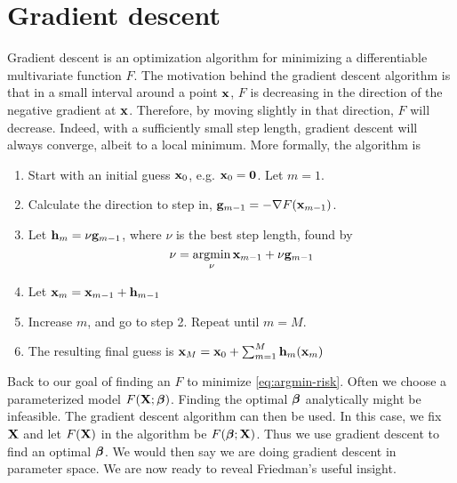 \section{Gradient descent}
Gradient descent is an optimization algorithm for minimizing a differentiable multivariate function $F$. The motivation behind the gradient descent algorithm is that in a small interval around a point $\mathbf{x}$, $F$ is decreasing in the direction of the negative gradient at $\mathbf{x}$. Therefore, by moving slightly in that direction, $F$ will decrease. Indeed, with a sufficiently small step length, gradient descent will always converge, albeit to a local minimum. More formally, the algorithm is
\begin{enumerate}
    \item Start with an initial guess $\mathbf{x}_0$, e.g. $\mathbf{x}_0=\mathbf{0}$. Let $m=1$.
    \item Calculate the direction to step in, $\mathbf{g}_{m-1}=-\nabla F(\mathbf{x}_{m-1})$.
    \item Let $\mathbf{h}_m=\nu \mathbf{g}_{m-1}$, where $\nu$ is the best step length, found by
        \begin{equation*}
            \nu=\operatorname*{argmin}_{\nu}\mathbf{x}_{m-1}+\nu \mathbf{g}_{m-1}
        \end{equation*}
    \item Let $\mathbf{x}_m=\mathbf{x}_{m-1}+\mathbf{h}_{m-1}$
    \item Increase $m$, and go to step 2. Repeat until $m=M$.
    \item The resulting final guess is $\mathbf{x}_M=\mathbf{x}_0+\sum_{m=1}^M\mathbf{h}_m(\mathbf{x}_m)$
\end{enumerate}
Back to our goal of finding an $F$ to minimize \eqref{eq:argmin-risk}. Often we choose a parameterized model $F(\mathbf{X};\boldsymbol{\beta})$. Finding the optimal $\boldsymbol{\beta}$ analytically might be infeasible. The gradient descent algorithm can then be used. In this case, we fix $\mathbf{X}$ and let $F(\mathbf{X})$ in the algorithm be $F(\boldsymbol{\beta};\mathbf{X})$. Thus we use gradient descent to find an optimal $\boldsymbol{\beta}$. We would then say we are doing gradient descent in parameter space. We are now ready to reveal Friedman's useful insight.

